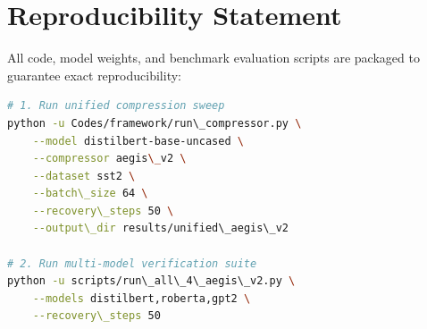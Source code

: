 \section{Reproducibility Statement}
All code, model weights, and benchmark evaluation scripts are packaged to guarantee exact reproducibility:
\begin{lstlisting}[language=bash]
# 1. Run unified compression sweep
python -u Codes/framework/run\_compressor.py \
    --model distilbert-base-uncased \
    --compressor aegis\_v2 \
    --dataset sst2 \
    --batch\_size 64 \
    --recovery\_steps 50 \
    --output\_dir results/unified\_aegis\_v2

# 2. Run multi-model verification suite
python -u scripts/run\_all\_4\_aegis\_v2.py \
    --models distilbert,roberta,gpt2 \
    --recovery\_steps 50
\end{lstlisting}
